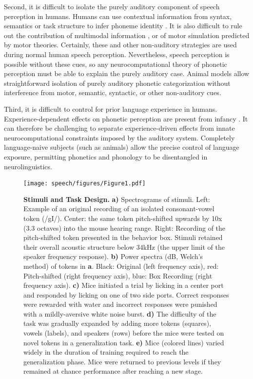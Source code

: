 Second, it is difficult to isolate the purely auditory component of speech perception in humans. Humans can use contextual information from syntax, semantics or task structure to infer phoneme identity \citep{Fox2016,Schouten2003}. It is also difficult to rule out the contribution of multimodal information \citep{Rosenblum2008}, or of motor simulation predicted by motor theories. Certainly, these and other non-auditory strategies are used during normal human speech perception. Nevertheless, speech perception is possible without these cues, so any neurocomputational theory of phonetic perception must be able to explain the purely auditory case. Animal models allow straightforward isolation of purely auditory phonetic categorization without interference from motor, semantic, syntactic, or other non-auditory cues.

Third, it is difficult to control for prior language experience in humans. Experience-dependent effects on phonetic perception are present from infancy \citep{Kuhl1992}. It can therefore be challenging to separate experience-driven effects from innate neurocomputational constraints imposed by the auditory system. Completely language-naive subjects (such as animals) allow the precise control of language exposure, permitting phonetics and phonology to be disentangled in neurolinguistics.

\begin{figure}[!hb]
\caption{\textbf{Stimuli and Task Design.} \textbf{a)} Spectrograms of stimuli. Left: Example of an original recording of an isolated consonant-vowel token (/gI/). Center: the same token pitch-shifted upwards by 10x (3.3 octaves) into the mouse hearing range. Right: Recording of the pitch-shifted token presented in the behavior box. Stimuli retained their overall acoustic structure below 34kHz (the upper limit of the speaker frequency response). \textbf{b)} Power spectra (dB, Welch's method) of tokens in \textbf{a}. Black: Original (left frequency axis), red: Pitch-shifted (right frequency axis), blue: Box Recording (right frequency axis). \textbf{c)} Mice initiated a trial by licking in a center port and responded by licking on one of two side ports. Correct responses were rewarded with water and incorrect responses were punished with a mildly-aversive white noise burst. \textbf{d)} The difficulty of the task was gradually expanded by adding more tokens (squares), vowels (labels), and speakers (rows) before the mice were tested on novel tokens in a generalization task. \textbf{e)} Mice (colored lines) varied widely in the duration of training required to reach the generalization phase. Mice were returned to previous levels if they remained at chance performance after reaching a new stage.
}
\label{spectro}
\texttt{[image: speech/figures/Figure1.pdf]}
\end{figure}


